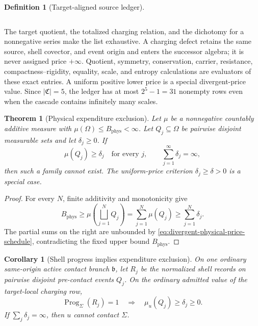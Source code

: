 \documentclass[11pt]{article}
\numberwithin{section}{part}
\theoremstyle{plain}
\newtheorem{theorem}{Theorem}[section]
\newtheorem{corollary}[corollary]{Corollary}
\theoremstyle{definition}
\newtheorem{definition}[definition]{Definition}
\theoremstyle{remark}
\newcommand{\Channels}{\mathfrak C}
\newcommand{\Phys}{\mathrm{phys}}
\newcommand{\Budget}{B_{\Phys}}
\begin{document}
\begin{definition}[Target-aligned source ledger]
\begin{enumerate}[label=\textup{(L\arabic*)}]
\begin{equation}
  \end{equation}
\end{enumerate}
The target quotient, the totalized charging relation, and the dichotomy for a
nonnegative series make the list exhaustive.  A charging defect retains the
same source, shell covector, and event origin and enters the successor algebra;
it is never assigned price \(+\infty\).  Quotient, symmetry, conservation, carrier, resistance,
compactness--rigidity, equality, scale, and entropy calculations are
evaluators of these exact entries.  A uniform positive lower price is a
special divergent-price value.  Since \(|\Channels|=5\), the ledger has at
most \(2^5-1=31\) nonempty rows even when the cascade contains infinitely
many scales.
\end{definition}

\begin{theorem}[Physical expenditure exclusion]
\label{thm:physical-expenditure-exclusion}
Let \(\mu\) be a nonnegative countably additive measure with
\(\mu(\Omega)\le \Budget<\infty\).  Let \(Q_j\subseteq\Omega\) be pairwise
disjoint measurable sets and let \(\delta_j\ge0\).  If
\begin{equation}
 \label{eq:divergent-physical-price-schedule}
 \mu(Q_j)\ge\delta_j
 \quad\text{for every }j,
 \qquad
 \sum_{j=1}^{\infty}\delta_j=\infty,
\end{equation}
then such a family cannot exist.  The uniform-price criterion
\(\delta_j\ge\delta>0\) is a special case.
\end{theorem}

\begin{proof}
For every \(N\), finite additivity and monotonicity give
\[
 \Budget\ge
 \mu\!\left(\bigsqcup_{j=1}^{N}Q_j\right)
 =\sum_{j=1}^{N}\mu(Q_j)
 \ge \sum_{j=1}^{N}\delta_j.
\]
The partial sums on the right are unbounded by
\eqref{eq:divergent-physical-price-schedule}, contradicting the fixed upper
bound \(\Budget\).
\end{proof}

\begin{corollary}[Shell progress implies expenditure exclusion]
\label{cor:shell-price-exclusion}
On one ordinary same-origin active contact branch \(\mathfrak b\), let
\(R_j\) be the normalized shell records on pairwise disjoint pre-contact
events \(Q_j\).  On the ordinary admitted value of the target-local charging
row,
\begin{equation}
 \label{eq:unit-progress-physical-price}
 \operatorname{Prog}_\Sigma(R_j)=1
 \quad\Longrightarrow\quad
 \mu_u(Q_j)\ge\delta_j\ge0.
\end{equation}
If \(\sum_j\delta_j=\infty\), then \(u\) cannot contact \(\Sigma\).
\end{corollary}
\end{document}
